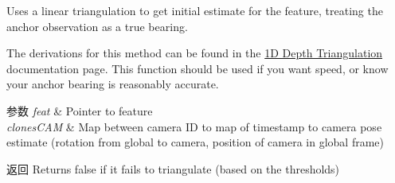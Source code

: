 Uses a linear triangulation to get initial estimate for the feature, treating the anchor observation as a true bearing. 

The derivations for this method can be found in the \hyperlink{update-featinit_featinit-linear-1d}{1D Depth Triangulation} documentation page. This function should be used if you want speed, or know your anchor bearing is reasonably accurate.


\begin{DoxyParams}{参数}
{\em feat} & Pointer to feature \\
\hline
{\em clones\+C\+AM} & Map between camera ID to map of timestamp to camera pose estimate (rotation from global to camera, position of camera in global frame) \\
\hline
\end{DoxyParams}
\begin{DoxyReturn}{返回}
Returns false if it fails to triangulate (based on the thresholds) 
\end{DoxyReturn}
